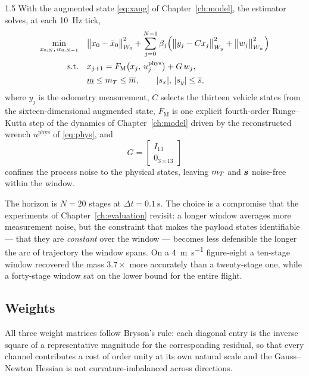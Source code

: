 \begin{spacing}{1.5}
With the augmented state \eqref{eq:xaug} of Chapter~\ref{ch:model}, the estimator
solves, at each \SI{10}{\hertz} tick,
\begin{align}
\min_{x_{0:N},\, w_{0:N-1}} \quad
& \bigl\| x_0 - \bar{x}_0 \bigr\|^2_{W_0}
+ \sum_{j=0}^{N-1} \beta_j \Bigl( \bigl\| y_j - C x_j \bigr\|^2_{W_y}
+ \bigl\| w_j \bigr\|^2_{W_w} \Bigr) \nonumber \\
\mathrm{s.t.} \quad
& x_{j+1} = F_{\mathrm{M}}\bigl(x_j,\, u^{\mathrm{phys}}_j\bigr) + G\,w_j, \nonumber \\
& \underline{m} \le m_T \le \overline{m}, \qquad
  |s_x|,\,|s_y| \le \overline{s},
\label{eq:mhe}
\end{align}
where $y_j$ is the odometry measurement, $C$ selects the thirteen vehicle states
from the sixteen-dimensional augmented state, $F_{\mathrm{M}}$ is one explicit
fourth-order Runge--Kutta step of the dynamics of Chapter~\ref{ch:model} driven
by the reconstructed wrench $u^{\mathrm{phys}}$ of \eqref{eq:phys}, and
\begin{equation}
G = \begin{bmatrix} I_{13} \\ 0_{3\times13}\end{bmatrix}
\label{eq:Gmat}
\end{equation}
confines the process noise to the physical states, leaving $m_T$ and $\bm{s}$
noise-free within the window.

The horizon is $N=20$ stages at $\Delta t=\SI{0.1}{\second}$. The choice is a
compromise that the experiments of Chapter~\ref{ch:evaluation} revisit: a longer
window averages more measurement noise, but the constraint that makes the payload
states identifiable --- that they are \emph{constant} over the window --- becomes
less defensible the longer the arc of trajectory the window spans. On a
\SI{4}{\meter\per\second} figure-eight a ten-stage window recovered the mass
$3.7\times$ more accurately than a twenty-stage one, while a forty-stage window
sat on the lower bound for the entire flight.

\subsection{Weights}\label{sec:frame:weights}

All three weight matrices follow Bryson's rule: each diagonal entry is the
inverse square of a representative magnitude for the corresponding residual, so
that every channel contributes a cost of order unity at its own natural scale and
the Gauss--Newton Hessian is not curvature-imbalanced across directions.


\end{spacing}
